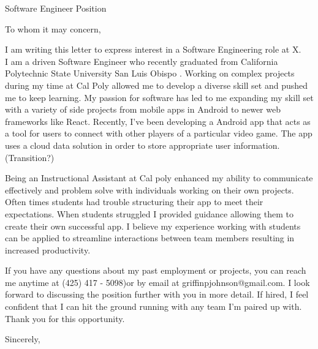 \documentclass[]{letter}
\makeatletter
\newcommand{\companyName}{Software Engineering role at X}
\newcommand{\university}
{
	California Polytechnic State University San Luis Obispo
}
\newcommand{\email}{griffinpjohnson@gmail.com}
\newcommand{\phoneNum}{(425) 417 - 5098)}
\makeatother
\begin{document}

\begin{letter}
{
	Software Engineer Position
}

\address
{
	1200 Oceanaire Dr Apt B \\
	San Luis Obispo, CA 93405 
}

\opening{To whom it may concern,}

I am writing this letter to express interest in a \companyName .\\ 

I am a driven Software Engineer who recently graduated from \university . Working on complex projects during my time at Cal Poly allowed me to develop a diverse skill set and pushed me to keep learning. My passion for software has led to me expanding my skill set with a variety of side projects from mobile apps in Android to newer web frameworks like React. Recently, I've been developing a Android app that acts as a tool for users to connect with other players of a particular video game. The app uses a cloud data solution in order to store appropriate user information.\\ 

(Transition?)

Being an Instructional Assistant at Cal poly enhanced my ability to communicate effectively and problem solve with individuals working on their own projects. Often times students had trouble structuring their app to meet their expectations. When students struggled I provided guidance allowing them to create their own successful app. I believe my experience working with students can be applied to streamline interactions between team members resulting in increased productivity. 

If you have any questions about my past employment or projects, you can reach me anytime at \phoneNum or by email at \email. I look forward to discussing the position further with you in more detail. If hired, I feel confident that I can hit the ground running with any team I'm paired up with. \\

Thank you for this opportunity.

\signature
{ 
	Griffin Johnson
}


\closing
{
	Sincerely,
}


\end{letter}
\end{document}
